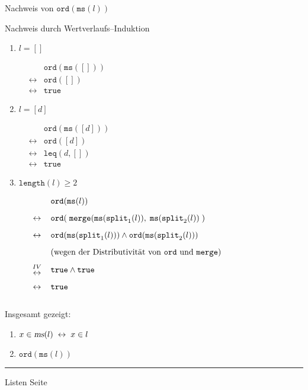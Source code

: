 \begin{slide}{}
\normalsize

\begin{center}
Nachweis von $\texttt{ord}(\texttt{ms}(l))$
\end{center}
\vspace*{0.5cm}

\footnotesize
Nachweis durch Wertverlaufs--Induktion
\begin{enumerate}
\item $l = []$

      $
      \begin{array}{lcl}
        &            & \mathtt{ord}(\mathtt{ms}([])) \\[0.3cm]
        & \leftrightarrow & \mathtt{ord}([])         \\[0.3cm]
        & \leftrightarrow & \mathtt{true}   
      \end{array}
      $
\item $l = [d]$

      $
      \begin{array}{lcl}
        &            & \mathtt{ord}(\mathtt{ms}([d])) \\[0.3cm]
        & \leftrightarrow & \mathtt{ord}([d])         \\[0.3cm]
        & \leftrightarrow & \mathtt{leq}(d, [])       \\[0.3cm]
        & \leftrightarrow & \mathtt{true}   
      \end{array}
      $

\item $\mathtt{length}(l) \geq 2$

      $
      \begin{array}{lcl}
      &                 & \mathtt{ord}(\mathtt{ms}(l))  \\[0.3cm]
      & \leftrightarrow & \mathtt{ord}(\;\mathtt{merge}(\mathtt{ms}(\mathtt{split}_1(l)),\; \mathtt{ms}(\mathtt{split}_2(l))\;) \\[0.3cm]
      & \leftrightarrow & \mathtt{ord}(\mathtt{ms}(\mathtt{split}_1(l))) \wedge \mathtt{ord}(\mathtt{ms}(\mathtt{split}_2(l))) \\[0.3cm]
      &                 & (\mbox{wegen der Distributivit\"at von \texttt{ord} und \texttt{merge}}) \\[0.3cm]
      & {IV \atop \displaystyle\leftrightarrow} & \mathtt{true} \wedge \mathtt{true} \\[0.3cm]
      & \leftrightarrow & \mathtt{true}  \\[0.3cm]
      \end{array}
      $
\end{enumerate}
Insgesamt gezeigt:
\begin{enumerate}
\item $x \in \textsl{ms}(l) \;\leftrightarrow\; x \in l$
\item $\mathtt{ord}(\mathtt{ms}(l))$
\end{enumerate}


\vspace*{\fill}
\tiny \addtocounter{mypage}{1}
\rule{17cm}{1mm}
Listen  \hspace*{\fill} Seite 
\end{slide}

